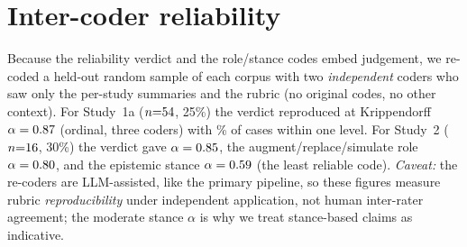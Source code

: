 \section{Inter-coder reliability}\label{app:irr}
Because the reliability verdict and the role/stance codes embed judgement, we re-coded a held-out random sample of
each corpus with two \emph{independent} coders who saw only the per-study summaries and the rubric (no original
codes, no other context). For Study~1a ($n{=}54$, 25\%) the verdict reproduced at Krippendorff
$\alpha=0.87$ (ordinal, three coders) with \IRRsoneWone\% of cases within one level. For Study~2
($n{=}16$, 30\%) the verdict gave $\alpha=0.85$, the augment/replace/simulate role $\alpha=0.80$,
and the epistemic stance $\alpha=0.59$ (the least reliable code). \emph{Caveat:} the re-coders are
LLM-assisted, like the primary pipeline, so these figures measure rubric \emph{reproducibility} under independent
application, not human inter-rater agreement; the moderate stance $\alpha$ is why we treat stance-based claims as
indicative.

